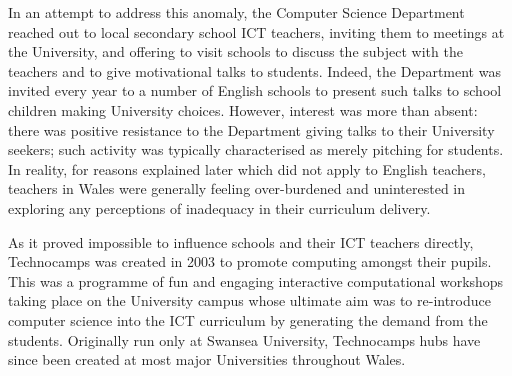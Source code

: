 \documentclass{sig-alternate}
\begin{document}
In an attempt to address this anomaly,
the Computer Science Department reached out
to local secondary school ICT teachers,
inviting them to meetings at the University,
and offering to visit schools to discuss
the subject with the teachers and to give
motivational talks to students.
Indeed, the Department was invited every year to
a number of English schools to present such talks
to school children making University choices.
However, interest was more than absent:
there was positive resistance to the Department
giving talks to their University seekers;
such activity was typically characterised as merely pitching for students.
In reality, for reasons explained later
which did not apply to English teachers,
teachers in Wales were generally feeling over-burdened and
uninterested in exploring any perceptions
of inadequacy in their curriculum delivery.

As it proved impossible to influence schools and their ICT teachers directly,
Technocamps was created in 2003 to promote computing amongst their pupils.
This was a programme of fun and engaging interactive computational workshops
taking place on the University campus
whose ultimate aim was to re-introduce computer science into
the ICT curriculum by generating the demand from the students.
Originally run only at Swansea University,
Technocamps hubs have since been created at most major Universities
throughout Wales.
\end{document}
